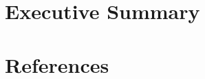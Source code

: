 \documentclass[11pt,fullpage]{article}
\begin{document}


\section{Executive Summary}





\newpage






% 
















\clearpage






\section*{References}




\appendix



\end{document}
